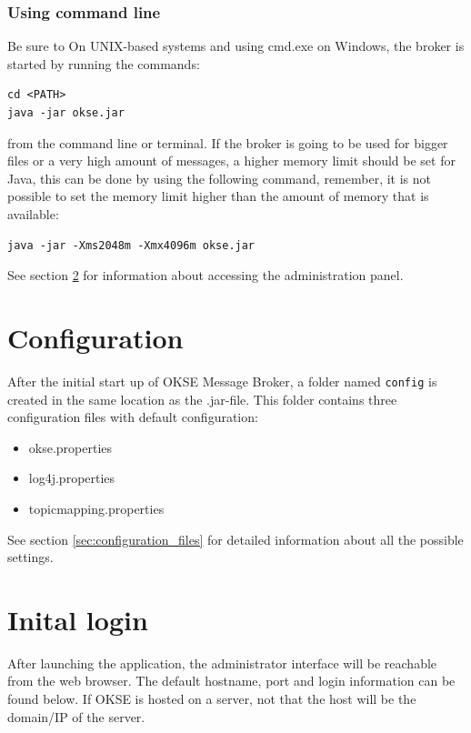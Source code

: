 \subsubsection{Using command line}
Be sure to 
On UNIX-based systems and using cmd.exe on Windows, the broker is started by running the commands: 
\begin{verbatim}
cd <PATH>
java -jar okse.jar
\end{verbatim}

\noindent from the command line or terminal. If the broker is going to be used for bigger files or a very high amount of messages, a higher memory limit should be set for Java, this can be done by using the following command, remember, it is not possible to set the memory limit higher than the amount of memory that is available: 
\begin{verbatim}
java -jar -Xms2048m -Xmx4096m okse.jar
\end{verbatim}
See section \ref{sec:inital-login} for information about accessing the administration panel.

\section{Configuration}

After the initial start up of OKSE Message Broker, a folder named \verb!config! is created in the same location as the .jar-file. This folder contains three configuration files with default configuration:

\begin{itemize}
\setlength{\itemsep}{0cm}%
\item okse.properties
\item log4j.properties
\item topicmapping.properties
\end{itemize}

\noindent See section \ref{sec:configuration_files} for detailed information about all the possible settings.

\section{Inital login}
\label{sec:inital-login}

After launching the application, the administrator interface will be reachable from the web browser. The default hostname, port and login information can be found below. If OKSE is hosted on a server, not that the host will be the domain/IP of the server.

